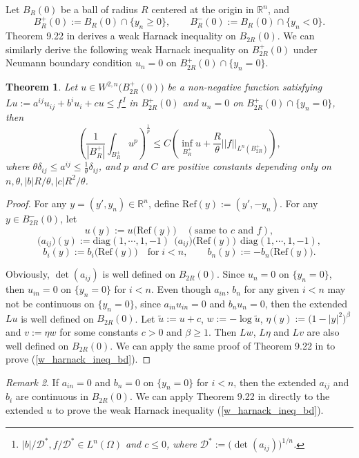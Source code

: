 \documentclass[12pt]{amsart}
\newtheorem{theorem}{Theorem}[section]
\theoremstyle{definition}
\theoremstyle{remark}
\newtheorem{remark}[theorem]{Remark}
\numberwithin{equation}{section}
\begin{document}
Let $B_R(0)$ be a ball of radius $R$ centered at the origin in $\mathbb{R}^n$, and
$$B_{R}^{+}(0) := B_{R}(0) \cap \{y_n \geq 0\}, \qquad B_{R}^{-}(0) := B_{R}(0) \cap \{y_n < 0\}.$$
Theorem 9.22 in \cite{GT} derives a weak Harnack inequality on $B_{2R}(0)$.
We can similarly derive the following weak Harnack inequality on $B_{2R}^{+}(0)$ under Neumann boundary condition $u_n = 0$ on $B_{2R}^{+}(0) \cap \{y_n = 0\}$.
\begin{theorem}\label{weak_harnack_bd_thm}
	Let $u \in W^{2,n}\big(B_{2R}^{+}(0)\big)$ be a non-negative function satisfying $Lu := a^{ij}u_{ij} + b^{i}u_{i} + cu \leq f$\footnote{$|b|/\mathcal{D}^*, f/\mathcal{D}^* \in L^n(\Omega)$ and $c \leq 0$, where $\mathcal{D}^* := \big(\det(a_{ij})\big)^{1/n}$.} in $B_{2R}^{+}(0)$ and $u_n = 0$ on $B_{2R}^{+}(0) \cap \{y_n = 0\}$, then 
	\begin{equation}\label{w_harnack_ineq_bd}
	\left( \frac{1}{|B_R^{+}|} \int_{B_R^{+}} u^p \right)^{\frac{1}{p}} \leq C \left( \inf_{B_R^{+}} u + \frac{R}{\theta} ||f||_{L^n(B_{2R}^{+})} \right),
	\end{equation}
	where $\theta \delta_{ij}\leq a^{ij} \leq \frac{1}{\theta} \delta_{ij}$, and $p$ and $C$ are positive constants depending only on $n, \theta, |b|R/\theta, |c|R^2/\theta$.
\end{theorem}
\begin{proof}
	For any $y = (y', y_n) \in \mathbb{R}^n$, define $\text{Ref}(y) := (y', - y_n)$.
	For any $y \in B_{2R}^{-}(0)$, let
	$$u(y) := u\big(\text{Ref}(y)\big) \quad (\text{same to $c$ and $f$}),$$ $$\big(a_{ij}\big)(y) := \text{diag} (1, \cdots, 1, -1) \;\, \big(a_{ij}\big)\big(\text{Ref}(y)\big)\;\, \text{diag} (1, \cdots, 1, -1),$$
	$$b_i (y) := b_i\big(\text{Ref}(y)\big) \quad \text{for}\; i<n, \qquad b_n (y) := -b_n\big(\text{Ref}(y)\big).$$
	
	Obviously, $\det(a_{ij})$ is well defined on $B_{2R}(0)$.
	Since $u_n = 0$ on $\{y_n = 0\}$, then $u_{in} = 0$ on $\{y_n = 0\}$ for $i < n$.
	Even though $a_{in}$, $b_n$ for any given $i < n$ may not be continuous on $\{y_n = 0\}$, since $a_{in} u_{in} = 0$ and $b_n u_n =0$, then the extended $Lu$ is well defined on $B_{2R}(0)$. 
	Let $\tilde{u} := u + c$, $w := - \log \tilde{u}$, $\eta (y) := \big(1 - |y|^2\big)^\beta$ and $v := \eta w$ for some constants $c > 0$ and $\beta \geq 1$. Then $Lw$, $L\eta$ and $Lv$ are also well defined on $B_{2R}(0)$.
	We can apply the same proof of Theorem 9.22 in \cite{GT} to prove (\ref{w_harnack_ineq_bd}).
\end{proof}
\begin{remark}
	If $a_{in} = 0$ and $b_n = 0$ on $\{y_n = 0\}$ for $i < n$, then the extended $a_{ij}$ and $b_i$ are continuous in $B_{2R}(0)$. We can apply Theorem 9.22 in \cite{GT} directly to the extended $u$ to prove the weak Harnack inequality (\ref{w_harnack_ineq_bd}).
\end{remark}
\end{document}
